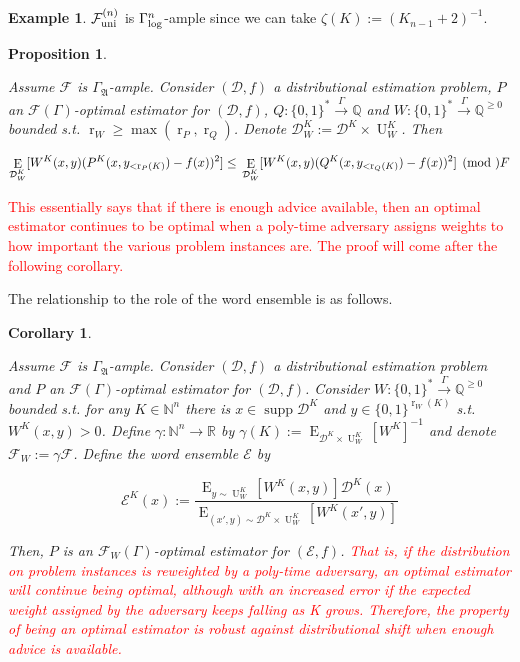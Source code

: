 \documentclass[11pt]{article}
\numberwithin{equation}{section}
\theoremstyle{definition}
\newtheorem{example}{Example}[section]
\theoremstyle{plain}
\newtheorem{proposition}{Proposition}[section]
\newtheorem{corollary}{Corollary}[section]
\newcommand{\Bool}{\{0,1\}}
\newcommand{\Words}{{\Bool^*}}
\newcommand{\WordsLen}[1]{{\Bool^{#1}}}
\DeclareMathOperator{\Supp}{supp}
\DeclareMathOperator{\E}{E}
\DeclareMathOperator{\R}{r}
\DeclareMathOperator{\Un}{U}
\newcommand{\Nats}{\mathbb{N}}
\newcommand{\Rats}{\mathbb{Q}}
\newcommand{\Reals}{\mathbb{R}}
\newcommand{\NatFun}{\Nats^n \rightarrow}
\newcommand{\Dist}{\mathcal{D}}
\newcommand{\GrowA}{\Gamma_{\mathfrak{A}}}
\newcommand{\Fall}{\mathcal{F}}
\newcommand{\EG}{\Fall(\Gamma)}
\newcommand{\GammaLog}{\Gamma_{\textnormal{log}}}
\newcommand{\FallU}{{\Fall_{\textnormal{uni}}^{(n)}}}
\newcommand{\Scheme}{\xrightarrow{\Gamma}}
\begin{document}
\begin{samepage}
\begin{example}

${\FallU}$ is ${\GammaLog^n}$-ample since we can take ${\zeta(K):=(K_{n-1}+2)^{-1}}$.

\end{example}
\end{samepage}

\begin{proposition}
\label{prp:weight}

Assume $\Fall$ is $\GrowA$-ample. Consider $(\Dist,f)$ a distributional estimation problem, $P$ an $\EG$-optimal estimator for $(\Dist,f)$, $Q: \Words \Scheme \Rats$ and ${W: \Words \Scheme \Rats^{\geq 0}}$ bounded s.t. ${\R_W \geq \max(\R_P, \R_Q)}$. Denote ${\Dist_W^K:=\Dist^K \times \Un_W^K}$. Then

\begin{equation}
\E_{\Dist_W^{K}}[W^{K}(x,y)(P^{K}(x,y_{<\R_P(K)}) - f(x))^2] \leq \\ \E_{\Dist_W^{K}}[W^{K}(x,y)(Q^{K}(x,y_{<\R_Q(K)}) - f(x))^2] \pmod \Fall
\end{equation}

\end{proposition}

\textcolor{red}{This essentially says that if there is enough advice available, then an optimal estimator continues to be optimal when a poly-time adversary assigns weights to how important the various problem instances are. The proof will come after the following corollary.}

The relationship to the role of the word ensemble is as follows.

\begin{samepage}
\begin{corollary}
\label{crl:weight}

Assume $\Fall$ is $\GrowA$-ample. Consider $(\Dist,f)$ a distributional estimation problem and $P$ an $\EG$-optimal estimator for $(\Dist,f)$. Consider ${W: \Words \Scheme \Rats^{\geq 0}}$ bounded s.t. for any $K \in \Nats^n$ there is $x \in \Supp \Dist^K$ and $y \in \WordsLen{\R_W(K)}$ s.t. $W^K(x,y) > 0$. Define ${\gamma: \NatFun \Reals}$ by ${\gamma(K):=\E_{\Dist^K \times \Un_W^K}[W^K]^{-1}}$ and denote ${\Fall_W:= \gamma\Fall}$. Define the word ensemble $\mathcal{E}$ by 

\[\mathcal{E}^K(x):=\frac{\E_{y \sim \Un_W^K}[W^K(x,y)] \Dist^K(x)}{\E_{(x',y) \sim \Dist^K \times \Un_W^K}[W^K(x',y)]}\]

Then, $P$ is an $\Fall_W(\Gamma)$-optimal estimator for $(\mathcal{E},f)$.
\textcolor{red}{That is, if the distribution on problem instances is reweighted by a poly-time adversary, an optimal estimator will continue being optimal, although with an increased error if the expected weight assigned by the adversary keeps falling as K grows. Therefore, the property of being an optimal estimator is robust against distributional shift when enough advice is available.}
\end{corollary}
\end{samepage}
\end{document}

